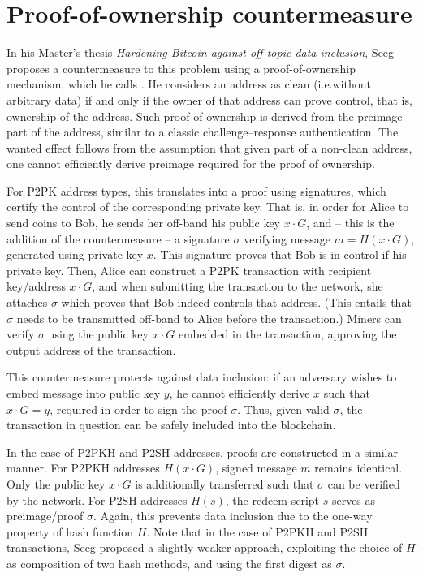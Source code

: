 \documentclass[a4paper,11pt,titlepage]{scrbook}
\begin{document}
\section{Proof-of-ownership countermeasure}

In his Master's thesis \emph{Hardening Bitcoin against off-topic data inclusion}, Seeg proposes a countermeasure to this problem using a proof-of-ownership mechanism, which he calls . \cite{seeg_hardening_2018}
%
He considers an address as clean (i.e.\@ without arbitrary data) if and only if the owner of that address can prove control, that is, ownership of the address.
Such proof of ownership is derived from the  preimage part of the address, similar to a classic challenge–response authentication.
The wanted effect follows from the assumption that given  part of a non-clean address, one cannot efficiently derive  preimage required for the proof of ownership.

For P2PK address types, this translates into a proof using signatures, which certify the control of the corresponding private key.
That is, in order for Alice to send coins to Bob, he sends her off-band his public key $x\cdot G$, and – this is the addition of the countermeasure – a signature $\sigma$ verifying message $m=H(x\cdot G)$, generated using private key $x$.
This signature proves that Bob is in control if his private key.
Then, Alice can construct a P2PK transaction with recipient key/address $x\cdot G$, and when submitting the transaction to the network, she attaches $\sigma$ which proves that Bob indeed controls that address. 
(This entails that $\sigma$ needs to be transmitted off-band to Alice before the transaction.)
Miners can verify $\sigma$ using the public key $x\cdot G$ embedded in the transaction, approving the output address of the transaction.

This countermeasure protects against data inclusion: if an adversary wishes to embed message into public key $y$, he cannot efficiently derive $x$ such that $x\cdot G = y$, required in order to sign the proof $\sigma$.
Thus, given valid $\sigma$, the transaction in question can be safely included into the blockchain.

In the case of P2PKH and P2SH addresses, proofs are constructed in a similar manner.
For P2PKH addresses $H(x\cdot G)$, signed message $m$ remains identical.
Only the public key $x\cdot G$ is additionally transferred such that $\sigma$ can be verified by the network.
For P2SH addresses $H(s)$, the redeem script $s$ serves as preimage/proof $\sigma$.
Again, this prevents data inclusion due to the one-way property of hash function $H$.
Note that in the case of P2PKH and P2SH transactions, Seeg proposed a slightly weaker approach, exploiting the choice of $H$ as composition of two hash methods, and using the first digest as $\sigma$.
\end{document}
